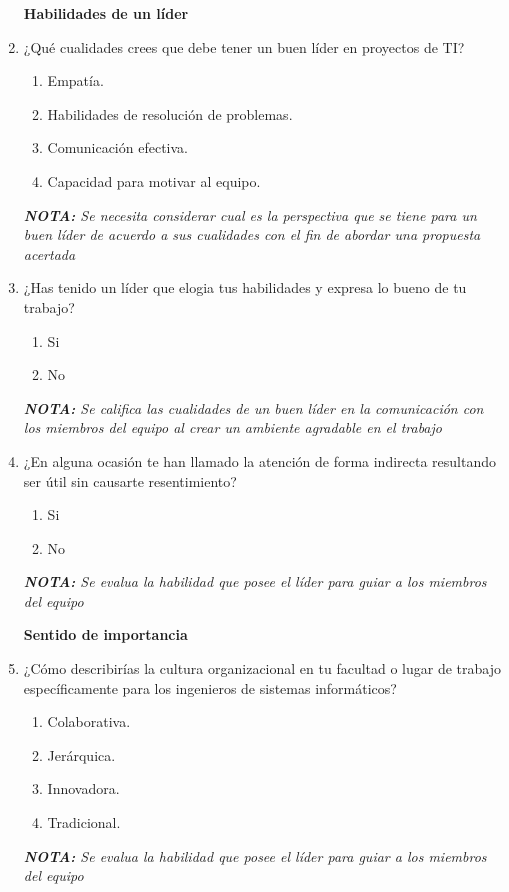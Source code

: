 \documentclass[journal]{IEEEtran}
\begin{document}
\begin{enumerate}
	\begin{center}
		\textbf{Habilidades de un líder}
	\end{center}
	
	\item ¿Qué cualidades crees que debe tener un buen líder en proyectos de TI?
	\begin{enumerate}
		\item Empatía.
		\item Habilidades de resolución de problemas.
		\item Comunicación efectiva.
		\item Capacidad para motivar al equipo.
	\end{enumerate}
	\textit{\textbf{NOTA:} Se necesita considerar cual es la perspectiva que se tiene para un buen líder de acuerdo a sus cualidades con el fin de abordar una propuesta acertada}
	
	\item ¿Has tenido un líder que elogia tus habilidades y expresa lo bueno de tu trabajo?
	\begin{enumerate}
		\item Si
		\item No
	\end{enumerate}
	\textit{\textbf{NOTA:} Se califica las cualidades de un buen líder en la comunicación con los miembros del equipo al crear un ambiente agradable en el trabajo}
	
	\item ¿En alguna ocasión te han llamado la atención de forma indirecta resultando ser útil sin causarte resentimiento?
	\begin{enumerate}
		\item Si
		\item No
	\end{enumerate}
	\textit{\textbf{NOTA:} Se evalua la habilidad que posee el líder para guiar a los miembros del equipo}
	
	\begin{center}
		\textbf{Sentido de importancia}
	\end{center}
	
	\item ¿Cómo describirías la cultura organizacional en tu facultad o lugar de trabajo específicamente para los ingenieros de sistemas informáticos?
	\begin{enumerate}
		\item Colaborativa.
		\item Jerárquica.
		\item Innovadora.
		\item Tradicional.
	\end{enumerate}
	\textit{\textbf{NOTA:} Se evalua la habilidad que posee el líder para guiar a los miembros del equipo}
	

\end{enumerate}
\end{document}
